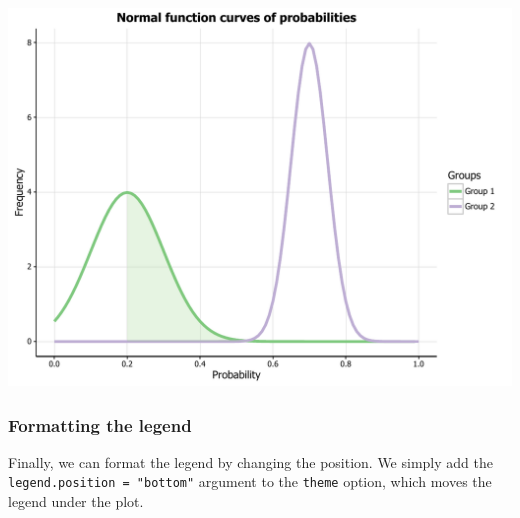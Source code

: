 \documentclass[]{article}
\newenvironment{Shaded}{\begin{snugshade}}{\end{snugshade}}
\newcommand{\KeywordTok}[1]{\textcolor[rgb]{0.13,0.29,0.53}{\textbf{{#1}}}}
\newcommand{\DataTypeTok}[1]{\textcolor[rgb]{0.13,0.29,0.53}{{#1}}}
\newcommand{\DecValTok}[1]{\textcolor[rgb]{0.00,0.00,0.81}{{#1}}}
\newcommand{\FloatTok}[1]{\textcolor[rgb]{0.00,0.00,0.81}{{#1}}}
\newcommand{\StringTok}[1]{\textcolor[rgb]{0.31,0.60,0.02}{{#1}}}
\newcommand{\OtherTok}[1]{\textcolor[rgb]{0.56,0.35,0.01}{{#1}}}
\newcommand{\NormalTok}[1]{{#1}}
\begin{document}
\begin{Shaded}
\end{Shaded}

\begin{center}\includegraphics{0_all_posts_pdf/function_17-1} \end{center}

\subsubsection{Formatting the legend}\label{formatting-the-legend-2}

Finally, we can format the legend by changing the position. We simply
add the \texttt{legend.position\ =\ "bottom"} argument to the
\texttt{theme} option, which moves the legend under the plot.
\end{document}
